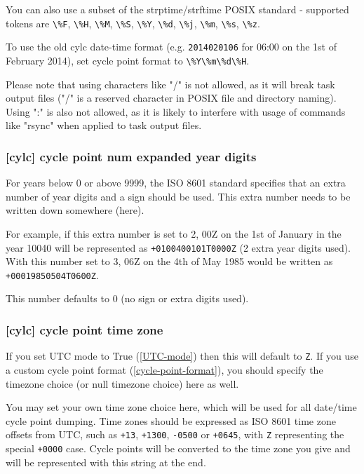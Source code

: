 You can also use a subset of the strptime/strftime POSIX standard - supported
tokens are \lstinline=\%F=, \lstinline=\%H=, \lstinline=\%M=, \lstinline=\%S=,
\lstinline=\%Y=, \lstinline=\%d=, \lstinline=\%j=, \lstinline=\%m=,
\lstinline=\%s=, \lstinline=\%z=.

To use the old cylc date-time format (e.g. \lstinline=2014020106= for 06:00
on the 1st of February 2014), set cycle point format to
\lstinline=\%Y\%m\%d\%H=.

Please note that using characters like "/" is not allowed, as it will break
task output files ("/" is a reserved character in POSIX file and directory
naming). Using ":" is also not allowed, as it is likely to interfere with
usage of commands like "rsync" when applied to task output files.

\subsubsection[cycle point num expanded year digits]{ [cylc] \textrightarrow
cycle point num expanded year digits}
\label{cycle-point-num-expanded-year-digits}

For years below 0 or above 9999, the ISO 8601 standard specifies that an
extra number of year digits and a sign should be used. This extra number needs
to be written down somewhere (here).

For example, if this extra number is set to 2, 00Z on the 1st of January in
the year 10040 will be represented as \lstinline=+0100400101T0000Z= (2 extra
year digits used). With this number set to 3, 06Z on the 4th of May 1985 would
be written as \lstinline=+00019850504T0600Z=.

This number defaults to 0 (no sign or extra digits used).

\subsubsection[cycle point time zone]{ [cylc] \textrightarrow
cycle point time zone}
\label{cycle-point-time-zone}

If you set UTC mode to True (\ref{UTC-mode}) then this will default to
\lstinline=Z=. If you use a custom cycle point format
(\ref{cycle-point-format}), you should specify the timezone choice (or null
timezone choice) here as well.

You may set your own time zone choice here, which will be used for all
date/time cycle point dumping. Time zones should be expressed as ISO 8601 time
zone offsets from UTC, such as \lstinline=+13=, \lstinline=+1300=,
\lstinline=-0500= or \lstinline=+0645=, with \lstinline=Z= representing the
special \lstinline=+0000= case. Cycle points will be converted to the time
zone you give and will be represented with this string at the end.

